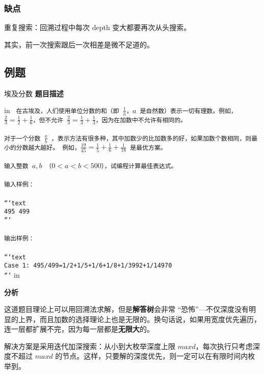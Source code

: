 \subsubsection{缺点}

重复搜索：回溯过程中每次 depth 变大都要再次从头搜索。

\begin{QUOTE}{}{}
其实，前一次搜索跟后一次相差是微不足道的。
\end{QUOTE}

\subsection{例题}

\begin{NOTE}{埃及分数}{}
\textbf{题目描述}
\end{NOTE}


 in
\texttt{
在古埃及，人们使用单位分数的和（即 $\frac{1}{a}$，$a$ 是自然数）表示一切有理数。例如，$\frac{2}{3}=\frac{1}{2}+\frac{1}{6}$，但不允许 $\frac{2}{3}=\frac{1}{3}+\frac{1}{3}$，因为在加数中不允许有相同的。 \\\\对于一个分数 $\frac{a}{b}$ ，表示方法有很多种，其中加数少的比加数多的好，如果加数个数相同，则最小的分数越大越好。 例如，$\frac{19}{45}=\frac{1}{5}+\frac{1}{6}+\frac{1}{18}$ 是最优方案。 \\\\输入整数 $a,b$ （$0<a<b<500$），试编程计算最佳表达式。\\\\输入样例：\\\\```text\\495 499\\```\\\\输出样例：\\\\```text\\Case 1: 495/499=1/2+1/5+1/6+1/8+1/3992+1/14970\\```}
 in

\textbf{分析}

这道题目理论上可以用回溯法求解，但是\textbf{解答树}会非常 “恐怖”—不仅深度没有明显的上界，而且加数的选择理论上也是无限的。换句话说，如果用宽度优先遍历，连一层都扩展不完，因为每一层都是\textbf{无限大}的。

解决方案是采用迭代加深搜索：从小到大枚举深度上限 $maxd$，每次执行只考虑深度不超过 $maxd$ 的节点。这样，只要解的深度优先，则一定可以在有限时间内枚举到。

